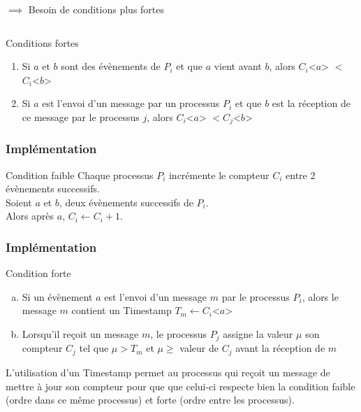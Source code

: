 \documentclass[compress]{beamer}
\begin{document}
\begin{frame}
\begin{columns}
\begin{column}{0.65 \textwidth}
$\implies$ Besoin de conditions plus fortes
	\end{column}
	\end{columns}
\begin{block}{Conditions fortes}
\begin{enumerate}
\item Si $a$ et $b$ sont des évènements de $P_i$ et que $a$ vient avant $b$, alors $C_i$<$a$> $<$ $C_i$<$b$>
\item Si $a$ est l'envoi d'un message par un processus $P_i$ et que $b$ est la réception de ce message par le processus $j$, alors $C_i$<$a$> $< C_j$<$b$>
\end{enumerate}
\end{block}
\end{frame}



\begin{frame}
\frametitle{Implémentation}
\begin{block}{Condition faible}
Chaque processus $P_i$ incrémente le compteur $C_i$ entre 2 évènements successifs.\\
Soient $a$ et $b$, deux évènements successifs de $P_i$. \\
Alors après $a$, $C_i \leftarrow C_i + 1$.
\end{block}
\end{frame}

\begin{frame}
	\frametitle{Implémentation}
	\begin{block}{Condition forte}
	\begin{enumerate}[(a)]
		\item Si un évènement $a$ est l'envoi d'un message $m$ par le processus $P_i$, alors le message $m$ contient un Timestamp $T_m \leftarrow C_i$<$a$>
		\item Lorsqu'il reçoit un message $m$, le processus $P_j$ assigne la valeur $\mu$ son compteur $C_j$ tel que $\mu > T_m$ et $\mu \geq$ valeur de $C_j$ avant la réception de $m$
	\end{enumerate}
	\end{block}
	\bigskip
	L'utilisation d'un Timestamp permet au processus qui reçoit un message de mettre à jour son compteur pour que que celui-ci respecte bien la condition faible (ordre dans ce même processus) et forte (ordre entre les processus).
\end{frame}
\end{document}
